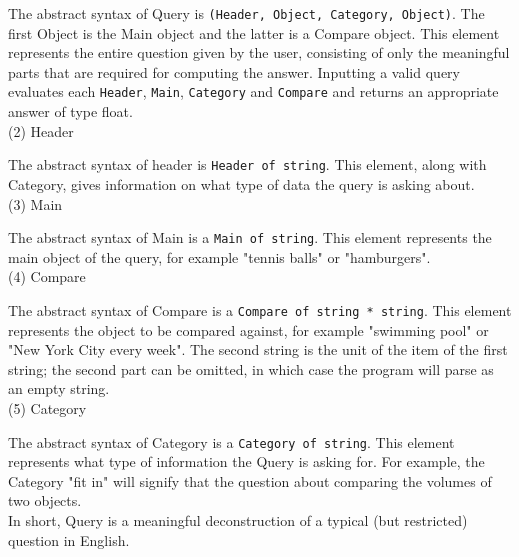 \documentclass{article}
\begin{document}
The abstract syntax of Query is \texttt{(Header, Object, Category, Object)}. The first Object is the Main object and the latter is a Compare object. This element represents the entire question given by the user, consisting of only the meaningful parts that are required for computing the answer. Inputting a valid query evaluates each \texttt{Header}, \texttt{Main}, \texttt{Category} and \texttt{Compare} and returns an appropriate answer of type float. \\

(2) Header 
\vspace{5pt}

The abstract syntax of header is \texttt{Header of string}. This element, along with Category, gives information on what type of data the query is asking about. \\

(3) Main 
\vspace{5pt}

The abstract syntax of Main is a \texttt{Main of string}. This element represents the main object of the query, for example "tennis balls" or "hamburgers". \\

(4) Compare 
\vspace{5pt}

The abstract syntax of Compare is a \texttt{Compare of string * string}. This element represents the object to be compared against, for example "swimming pool" or "New York City every week". The second string is the unit of the item of the first string; the second part can be omitted, in which case the program will parse as an empty string. \\

(5) Category 
\vspace{5pt}

The abstract syntax of Category is a \texttt{Category of string}. This element represents what type of information the Query is asking for. For example, the Category "fit in" will signify that the question about comparing the volumes of two objects.  \\

In short, Query is a meaningful deconstruction of a typical (but restricted) question in English. 

\end{document}
